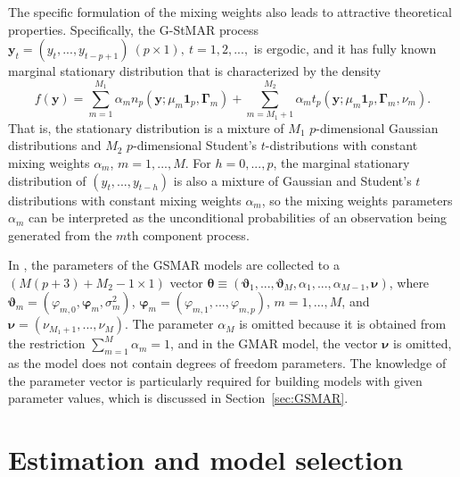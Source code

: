 \documentclass[nojss]{jss} %
\begin{document}
The specific formulation of the mixing weights also leads to attractive theoretical properties. Specifically, the G-StMAR process $\boldsymbol{y}_{t}=(y_{t},...,y_{t-p+1}) \ (p \times 1), \ t=1,2,...,$ is ergodic, and it has fully known marginal stationary distribution that is characterized by the density \citep[][Theorem 1; see the proof of Theorem 1 for the stationary distribution of $1,...,p+1$ consecutive observations]{Virolainen:2020}
\begin{equation}\label{eq:statdist}
f(\boldsymbol{y}) = \sum_{m=1}^{M_1}\alpha_m n_p(\boldsymbol{y};\mu_m\boldsymbol{1}_p,\boldsymbol{\Gamma}_m) + \sum_{m=M_1 + 1}^{M_2}\alpha_m t_p(\boldsymbol{y};\mu_m\boldsymbol{1}_p,\boldsymbol{\Gamma}_m,\nu_m).
\end{equation}
%
That is, the stationary distribution is a mixture of $M_1$ $p$-dimensional Gaussian distributions and $M_2$ $p$-dimensional Student's $t$-distributions with constant mixing weights $\alpha_m$, $m=1,...,M$. For $h=0,...,p$, the marginal stationary distribution of $(y_t,...,y_{t-h})$ is also a mixture of Gaussian and Student's $t$ distributions with constant mixing weights $\alpha_m$, so the mixing weights parameters $\alpha_m$ can be interpreted as the unconditional probabilities of an observation being generated from the $m$th component process.

In , the parameters of the GSMAR models are collected to a $(M(p+3)+M_2-1\times 1)$ vector $\boldsymbol{\theta} \equiv (\boldsymbol{\vartheta}_1,...,\boldsymbol{\vartheta}_M,\alpha_1,...,\alpha_{M-1},\boldsymbol{\nu})$, where $\boldsymbol{\vartheta}_m=(\varphi_{m,0},\boldsymbol{\varphi}_m,\sigma^2_m)$, $\boldsymbol{\varphi}_m=(\varphi_{m,1},...,\varphi_{m,p})$, $m=1,...,M$, and $\boldsymbol{\nu}=(\nu_{M_1+1},...,\nu_M)$. The parameter $\alpha_M$ is omitted because it is obtained from the restriction $\sum_{m=1}^M\alpha_m=1$, and in the GMAR model, the vector $\boldsymbol{\nu}$ is omitted, as the model does not contain degrees of freedom parameters. The knowledge of the parameter vector is particularly required for building models with given parameter values, which is discussed in Section~\ref{sec:GSMAR}.


\section{Estimation and model selection}\label{sec:estimation}
\end{document}
